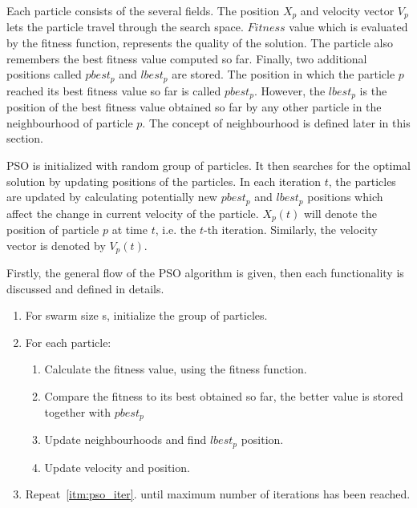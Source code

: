 \documentclass{mini}
\begin{document}
Each particle consists of the several fields. The position $X_p$ and velocity vector $V_p$ lets the particle travel through the search space. $Fitness$ value which is evaluated by the fitness function, represents the quality of the solution. The particle also remembers the best fitness value computed so far. Finally, two additional positions called $pbest_p$ and $lbest_p$ are stored. The position in which the particle $p$ reached its best fitness value so far is called $pbest_p$. However, the $lbest_p$ is the position of the best fitness value obtained so far by any other particle in the neighbourhood of particle $p$. The concept of neighbourhood is defined later in this section.

PSO is initialized with random group of particles. It then searches for the optimal solution by updating positions of the particles.
In each iteration $t$, the particles are updated by calculating potentially new $pbest_p$ and $lbest_p$ positions which affect the change in current velocity of the particle. $X_p(t)$ will denote the position of particle $p$ at time $t$, i.e. the $t$-th iteration. Similarly, the velocity vector is denoted by $V_p(t)$.

Firstly, the general flow of the PSO algorithm is given, then each functionality is discussed and defined in details.

\begin{center}
    
    \begin{enumerate}
        \item For swarm size s, initialize the group of particles.
        
        \item For each particle: \label{itm:pso_iter}
        \begin{enumerate}
            \item Calculate the fitness value, using the fitness function.
            \item Compare the fitness to its best obtained so far, the better value is stored together with $pbest_p$	
            
            \item Update neighbourhoods and find $lbest_p$ position.
            
            \item Update velocity and position.	
        \end{enumerate}
        
        \item Repeat~\ref{itm:pso_iter}. until maximum number of iterations has been reached.
        
    \end{enumerate}
    
\end{center}
\end{document}
